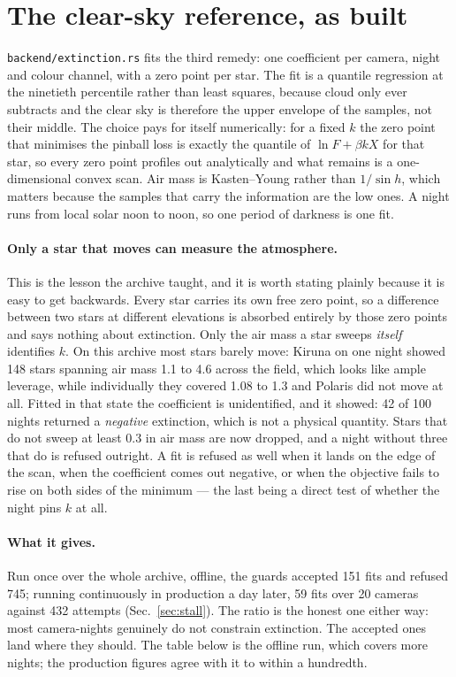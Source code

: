 \documentclass[11pt,a4paper]{article}
\begin{document}
\section{The clear-sky reference, as built}
\label{sec:reference}

\texttt{backend/extinction.rs} fits the third remedy: one coefficient per
camera, night and colour channel, with a zero point per star. The fit is a
quantile regression at the ninetieth percentile rather than least squares,
because cloud only ever subtracts and the clear sky is therefore the upper
envelope of the samples, not their middle. The choice pays for itself
numerically: for a fixed $k$ the zero point that minimises the pinball loss is
exactly the quantile of $\ln F + \beta k X$ for that star, so every zero point
profiles out analytically and what remains is a one-dimensional convex scan.
Air mass is Kasten--Young rather than $1/\sin h$, which matters because the
samples that carry the information are the low ones. A night runs from local
solar noon to noon, so one period of darkness is one fit.

\paragraph{Only a star that moves can measure the atmosphere.} This is the
lesson the archive taught, and it is worth stating plainly because it is easy
to get backwards. Every star carries its own free zero point, so a difference
between two stars at different elevations is absorbed entirely by those zero
points and says nothing about extinction. Only the air mass a star sweeps
\emph{itself} identifies $k$. On this archive most stars barely move: Kiruna
on one night showed 148 stars spanning air mass 1.1 to 4.6 across the field,
which looks like ample leverage, while individually they covered 1.08 to 1.3
and Polaris did not move at all. Fitted in that state the coefficient is
unidentified, and it showed: 42 of 100 nights returned a \emph{negative}
extinction, which is not a physical quantity. Stars that do not sweep at least
\num{0.3} in air mass are now dropped, and a night without three that do is
refused outright. A fit is refused as well when it lands on the edge of the
scan, when the coefficient comes out negative, or when the objective fails to
rise on both sides of the minimum --- the last being a direct test of whether
the night pins $k$ at all.

\paragraph{What it gives.} Run once over the whole archive, offline, the guards
accepted 151 fits and refused 745; running continuously in production a day
later, 59 fits over 20 cameras against 432 attempts (Sec.~\ref{sec:stall}). The
ratio is the honest one either way: most camera-nights genuinely do not
constrain extinction. The accepted ones land where they should. The table below
is the offline run, which covers more nights; the production figures agree with
it to within a hundredth.
\end{document}
